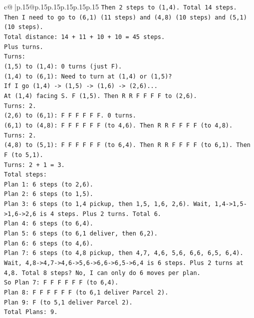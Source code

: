 \documentclass{article}
\begin{document}
{\begin{supertabular}{c@{$\;$}|p{.15\linewidth}@{}p{.15\linewidth}p{.15\linewidth}p{.15\linewidth}p{.15\linewidth}p{.15\linewidth}}
{{{\texttt{Then 2 steps to (1,4). Total 14 steps.} \\
\texttt{Then I need to go to (6,1) (11 steps) and (4,8) (10 steps) and (5,1) (10 steps).} \\
\texttt{Total distance: 14 + 11 + 10 + 10 = 45 steps.} \\
\texttt{Plus turns.} \\
\texttt{Turns:} \\
\texttt{(1,5) to (1,4): 0 turns (just F).} \\
\texttt{(1,4) to (6,1): Need to turn at (1,4) or (1,5)?} \\
\texttt{If I go (1,4) {-}> (1,5) {-}> (1,6) {-}> (2,6)...} \\
\texttt{At (1,4) facing S. F (1,5). Then R R F F F F to (2,6).} \\
\texttt{Turns: 2.} \\
\texttt{(2,6) to (6,1): F F F F F F. 0 turns.} \\
\texttt{(6,1) to (4,8): F F F F F F (to 4,6). Then R R F F F F (to 4,8).} \\
\texttt{Turns: 2.} \\
\texttt{(4,8) to (5,1): F F F F F F (to 6,4). Then R R F F F F (to 6,1). Then F (to 5,1).} \\
\texttt{Turns: 2 + 1 = 3.} \\
\texttt{Total steps:} \\
\texttt{Plan 1: 6 steps (to 2,6).} \\
\texttt{Plan 2: 6 steps (to 1,5).} \\
\texttt{Plan 3: 6 steps (to 1,4 pickup, then 1,5, 1,6, 2,6). Wait, 1,4{-}>1,5{-}>1,6{-}>2,6 is 4 steps. Plus 2 turns. Total 6.} \\
\texttt{Plan 4: 6 steps (to 6,4).} \\
\texttt{Plan 5: 6 steps (to 6,1 deliver, then 6,2).} \\
\texttt{Plan 6: 6 steps (to 4,6).} \\
\texttt{Plan 7: 6 steps (to 4,8 pickup, then 4,7, 4,6, 5,6, 6,6, 6,5, 6,4). Wait, 4,8{-}>4,7{-}>4,6{-}>5,6{-}>6,6{-}>6,5{-}>6,4 is 6 steps. Plus 2 turns at 4,8. Total 8 steps? No, I can only do 6 moves per plan.} \\
\texttt{So Plan 7: F F F F F F (to 6,4).} \\
\texttt{Plan 8: F F F F F F (to 6,1 deliver Parcel 2).} \\
\texttt{Plan 9: F (to 5,1 deliver Parcel 2).} \\
\texttt{Total Plans: 9.} \\
}}}
\end{supertabular}}
\end{document}
